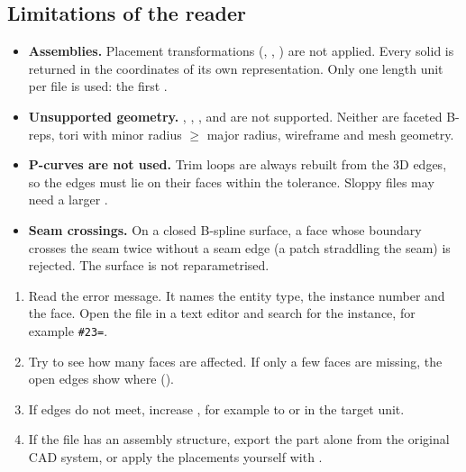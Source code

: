 \subsection{Limitations of the reader}

\begin{itemize}
  \item \textbf{Assemblies.} Placement transformations (,
    , ) are not
    applied. Every solid is returned in the coordinates of its own representation. Only one
    length unit per file is used: the first .
  \item \textbf{Unsupported geometry.} ,
    , ,
     and  are not supported.
    Neither are faceted B-reps, tori with minor radius $\ge$ major radius, wireframe and mesh
    geometry.
  \item \textbf{P-curves are not used.} Trim loops are always rebuilt from the 3D edges, so the
    edges must lie on their faces within the tolerance. Sloppy files may need a larger
    .
  \item \textbf{Seam crossings.} On a closed B-spline surface, a face whose boundary crosses the
    seam twice without a seam edge (a patch straddling the seam) is rejected. The surface is
    not reparametrised.
\end{itemize}

\begin{tip}
\begin{enumerate}
  \item Read the error message. It names the entity type, the instance number and the face.
    Open the file in a text editor and search for the instance, for example \texttt{\#23=}.
  \item Try  to see how many faces are affected. If only a few
    faces are missing, the open edges show where ().
  \item If edges do not meet, increase , for example to  or
     in the target unit.
  \item If the file has an assembly structure, export the part alone from the original CAD
    system, or apply the placements yourself with .
\end{enumerate}
\end{tip}

